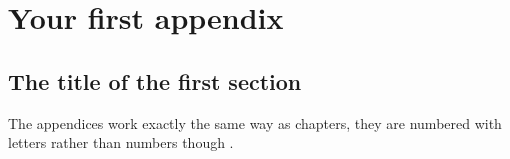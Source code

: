 \chapter{Your first appendix}
\section{The title of the first section}
The appendices work exactly the same way as chapters, they are numbered with letters rather than numbers though \autocite{hori1973}.